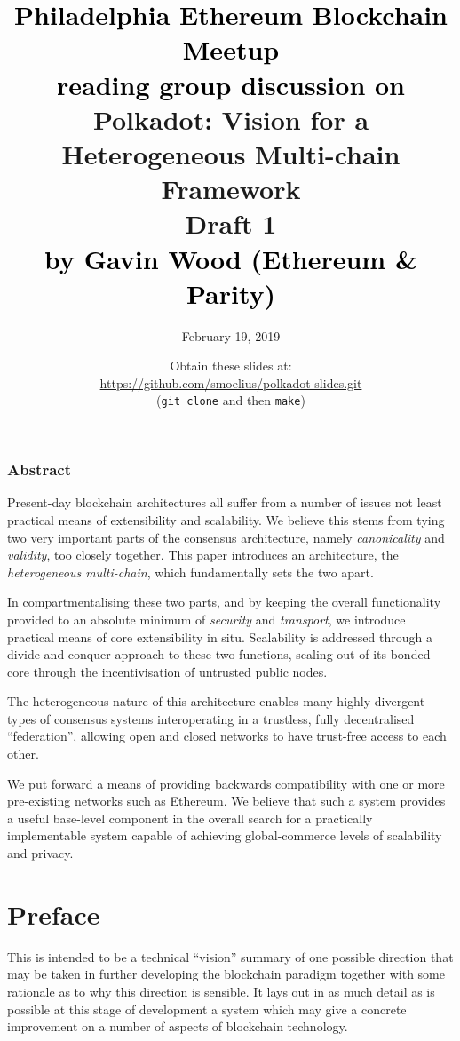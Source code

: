 \documentclass[usepdftitle=false]{beamer}
\title{\textcolor{black}{Philadelphia Ethereum Blockchain Meetup} \\
\textcolor{black}{reading group discussion on} \\
Polkadot: Vision for a Heterogeneous Multi-chain Framework \\ {\smaller \textbf{Draft 1}} \\
\textcolor{black}{by Gavin Wood (Ethereum \& Parity)}}
\author{February 19, 2019}
\date{Obtain these slides at: \\
\url{https://github.com/smoelius/polkadot-slides.git} \\
(\texttt{git clone} and then \texttt{make})}
\begin{document}
\maketitle

\begin{frame}
\frametitle{Abstract}

Present-day blockchain architectures all suffer from a number of issues not least practical means of extensibility and scalability. We believe this stems from tying two very important parts of the consensus architecture, namely \textit{canonicality} and \textit{validity}, too closely together. This paper introduces an architecture, the \textit{heterogeneous multi-chain}, which fundamentally sets the two apart.

In compartmentalising these two parts, and by keeping the overall functionality provided to an absolute minimum of \textit{security} and \textit{transport}, we introduce practical means of core extensibility in situ. Scalability is addressed through a divide-and-conquer approach to these two functions, scaling out of its bonded core through the incentivisation of untrusted public nodes.

 The heterogeneous nature of this architecture enables many highly divergent types of consensus systems interoperating in a trustless, fully decentralised ``federation'', allowing open and closed networks to have trust-free access to each other.

We put forward a means of providing backwards compatibility with one or more pre-existing networks such as Ethereum. We believe that such a system provides a useful base-level component in the overall search for a practically implementable system capable of achieving global-commerce levels of scalability and privacy.


\section{Preface}\label{preface}

 This is intended to be a technical ``vision'' summary of one possible direction that may be taken in further developing the blockchain paradigm together with some rationale as to why this direction is sensible. It lays out in as much detail as is possible at this stage of development a system which may give a concrete improvement on a number of aspects of blockchain technology.


\end{frame}
\end{document}
